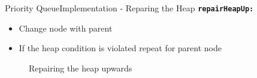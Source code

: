 \begin{frame}{Priority Queue}{Implementation - Reparing the Heap}
  {\color{Mittel-Blau}\texttt{\textbf{repairHeapUp:}}}
  \begin{itemize}
    \item<2->
      Change node with parent
    \item<3->
      If the {\color{Mittel-Blau}heap condition} is violated repeat for parent
      node
  \end{itemize}
  \begin{center}
    \begin{figure}[!h]%
      \begin{columns}%
        \begin{column}{0.45\linewidth}%
          \begin{adjustbox}{width=\linewidth}%
          \end{adjustbox}%
        \end{column}%
        \begin{column}{0.45\linewidth}%
          \begin{adjustbox}{width=\linewidth}%
          \end{adjustbox}%
        \end{column}%
      \end{columns}%
      \caption{Repairing the heap upwards}%
      \label{fig:priority_queue:impl_repair_heap_up}%
    \end{figure}
  \end{center}
\end{frame}


